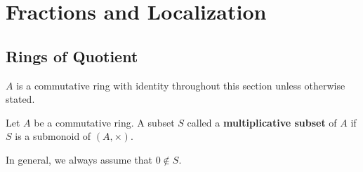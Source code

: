 \chapter{Fractions and Localization}
\section{Rings of Quotient}
$A$ is a commutative ring with identity throughout this section unless otherwise stated.

\begin{definition}
    Let $A$ be a commutative ring. A subset $S$ called a \textbf{multiplicative subset} of $A$ if $S$ is a submonoid of $\left(A, \times \right)$.
    \begin{remark}
        In general, we always assume that $0 \notin S$.
    \end{remark}
\end{definition}


